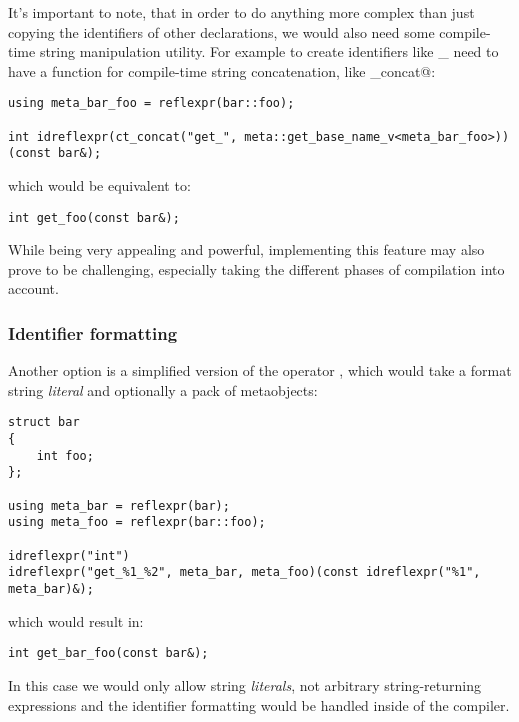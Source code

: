 It's important to note, that in order to do anything more complex than just
copying the identifiers of other declarations, we would also need some compile-time
string manipulation utility. For example to create identifiers like
\verb@get_%@ or \verb@set_%@ where \verb@%@ is a declaration name, we would
need to have a function for compile-time string concatenation, like
\verb@ct_concat@:

\begin{verbatim}
using meta_bar_foo = reflexpr(bar::foo);

int idreflexpr(ct_concat("get_", meta::get_base_name_v<meta_bar_foo>))(const bar&);
\end{verbatim}

which would be equivalent to:

\begin{verbatim}
int get_foo(const bar&);
\end{verbatim}

While being very appealing and powerful, implementing this feature may
also prove to be challenging, especially taking the different phases
of compilation into account.

\subsubsection{Identifier formatting}
\label{fut-ident-formatting}

Another option is a simplified version of the operator \verb@idreflexpr@,
which would take a format string {\em literal} and optionally a pack of
 metaobjects:

\begin{verbatim}
struct bar
{
	int foo;
};

using meta_bar = reflexpr(bar);
using meta_foo = reflexpr(bar::foo);

idreflexpr("int")
idreflexpr("get_%1_%2", meta_bar, meta_foo)(const idreflexpr("%1", meta_bar)&);
\end{verbatim}

which would result in:

\begin{verbatim}
int get_bar_foo(const bar&);
\end{verbatim}

In this case we would only allow string {\em literals}, not arbitrary
\verb@constexpr@ string-returning expressions and the identifier formatting
would be handled inside of the compiler.

